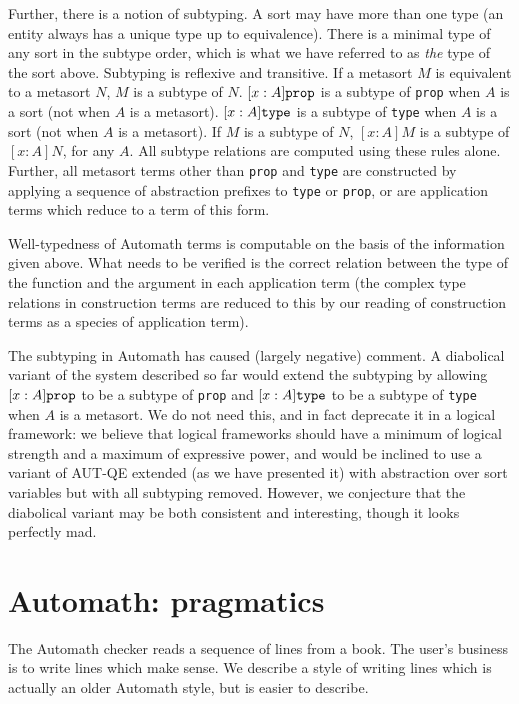 \documentclass{article}
\begin{document}
Further, there is a notion of subtyping.  A sort may have more than one type (an entity always has a unique type up to equivalence).  There is a minimal type of any sort in the subtype order, which is what we have referred to as {\em the\/} type of the sort above.  Subtyping is reflexive and transitive.  If a metasort $M$ is equivalent to a metasort $N$, $M$ is a subtype of $N$.  $[x:A]{\tt prop}$ is a subtype of {\tt prop} when $A$ is a sort (not when $A$ is a metasort).  $[x:A]{\tt type}$ is a subtype of {\tt type} when $A$ is a sort (not when $A$ is a metasort).  If $M$ is a subtype of $N$, $[x:A]M$ is a subtype of $[x:A]N$, for any $A$.  All subtype relations are computed using these rules alone.  Further, all metasort terms other than {\tt prop} and {\tt type} are constructed by applying a sequence of abstraction prefixes to
{\tt type} or {\tt prop}, or are application terms which reduce to a term of this form.

Well-typedness of Automath terms is computable on the basis of the information given above.  What needs to be verified is the correct relation between the type of the function and the argument in each application term (the complex type relations in construction terms are reduced to this by our reading of construction terms as a species of application term).

The subtyping in Automath has caused (largely negative) comment.  A diabolical variant of the system described so far would extend the subtyping by
allowing $[x:A]{\tt prop}$ to be a subtype of {\tt prop} and $[x:A]{\tt type}$ to be a subtype of {\tt type} when $A$ is a metasort.  We do not need this, and in fact deprecate it in a logical framework:  we believe that logical frameworks should have a minimum of logical strength and a maximum of expressive power, and would be inclined to use a variant of AUT-QE extended (as we have presented it) with abstraction over sort variables but with all subtyping removed.  However, we conjecture that the diabolical variant may be both consistent and interesting, though it looks perfectly mad.


\section{Automath:  pragmatics}

The Automath checker reads a sequence of lines from a book.  The user's business is to write lines which make sense.  We describe a style of writing lines which is actually an older Automath style, but is easier to describe.
\end{document}
